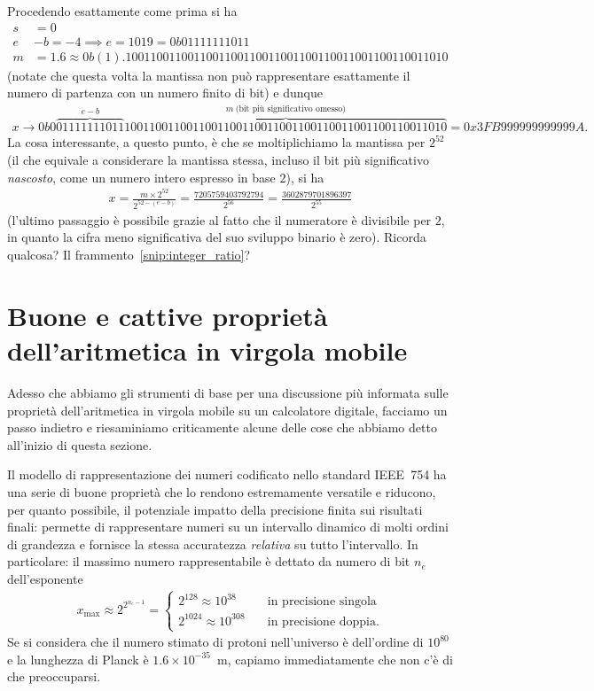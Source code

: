 Procedendo esattamente come prima si ha
\begin{align*}
  s & = 0 \\
  e & - b = - 4 \implies e = 1019 = 0b01111111011\\
  m & = 1.6 \approx 0b(1).1001100110011001100110011001100110011001100110011010
\end{align*}
(notate che questa volta la mantissa non può rappresentare esattamente il numero di
partenza con un numero finito di bit) e dunque
\begin{align*}
  x \rightarrow 0b0\overbrace{01111111011}^{e-b}
  \overbrace{1001100110011001100110011001100110011001100110011010}^{m~\text{(bit più significativo omesso)}}
  = 0x3FB999999999999A.
\end{align*}
La cosa interessante, a questo punto, è che se moltiplichiamo la mantissa per
$2^{52}$ (il che equivale a considerare la mantissa stessa, incluso il bit più
significativo \emph{nascosto}, come un numero intero espresso in base $2$), si ha
\begin{align*}
  x = \frac{m \times 2^{52}}{2^{52 - (e  - b)}} =
  \frac{7205759403792794}{2^{56}} = \frac{3602879701896397}{2^{55}}
\end{align*}
(l'ultimo passaggio è possibile grazie al fatto che il numeratore è divisibile
per $2$, in quanto la cifra meno significativa del suo sviluppo binario è zero).
Ricorda qualcosa? Il frammento~\ref{snip:integer_ratio}?


\section{Buone e cattive proprietà dell'aritmetica in virgola mobile}

Adesso che abbiamo gli strumenti di base per una discussione più informata sulle
proprietà dell'aritmetica in virgola mobile su un calcolatore digitale,
facciamo un passo indietro e riesaminiamo criticamente alcune delle cose che
abbiamo detto all'inizio di questa sezione.

Il modello di rappresentazione dei numeri codificato nello standard IEEE~754
ha una serie di buone proprietà che lo rendono estremamente versatile e
riducono, per quanto possibile, il potenziale impatto della precisione finita
sui risultati finali: permette di rappresentare numeri su un intervallo dinamico
di molti ordini di grandezza e fornisce la stessa accuratezza \emph{relativa}
su tutto l'intervallo. In particolare: il massimo numero rappresentabile è dettato
da numero di bit $n_e$ dell'esponente
\begin{align*}
  x_\text{max} \approx 2^{2^{n_e - 1}} =
  \begin{cases}
    2^{128} \approx 10^{38} \quad & \text{in precisione singola}\\
    2^{1024} \approx 10^{308} \quad & \text{in precisione doppia}.
  \end{cases}
\end{align*}
Se si considera che il numero stimato di protoni nell'universo è dell'ordine di
$10^{80}$ e la lunghezza di Planck è $1.6 \times 10^{-35}$~m, capiamo
immediatamente che non c'è di che preoccuparsi.


